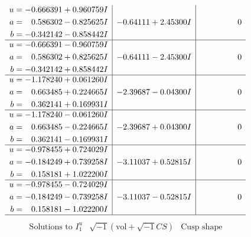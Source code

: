 \documentclass[1p]{elsarticle_modified}
\theoremstyle{definition}
\newcommand{\I}{\sqrt{-1}}
\begin{document}
$$\begin{array}{c|c|c}
\begin{aligned}
u &= -0.666391 + 0.960759 I \\
a &= \phantom{-}0.586302 - 0.825625 I \\
b &= -0.342142 - 0.858442 I\end{aligned}
 & -0.64111 + 2.45300 I & \phantom{-0.000000 } 0 \\ \hline\begin{aligned}
u &= -0.666391 - 0.960759 I \\
a &= \phantom{-}0.586302 + 0.825625 I \\
b &= -0.342142 + 0.858442 I\end{aligned}
 & -0.64111 - 2.45300 I & \phantom{-0.000000 } 0 \\ \hline\begin{aligned}
u &= -1.178240 + 0.061260 I \\
a &= \phantom{-}0.663485 + 0.224665 I \\
b &= \phantom{-}0.362141 + 0.169931 I\end{aligned}
 & -2.39687 - 0.04300 I & \phantom{-0.000000 } 0 \\ \hline\begin{aligned}
u &= -1.178240 - 0.061260 I \\
a &= \phantom{-}0.663485 - 0.224665 I \\
b &= \phantom{-}0.362141 - 0.169931 I\end{aligned}
 & -2.39687 + 0.04300 I & \phantom{-0.000000 } 0 \\ \hline\begin{aligned}
u &= -0.978455 + 0.724029 I \\
a &= -0.184249 + 0.739258 I \\
b &= \phantom{-}0.158181 + 1.022200 I\end{aligned}
 & -3.11037 + 0.52815 I & \phantom{-0.000000 } 0 \\ \hline\begin{aligned}
u &= -0.978455 - 0.724029 I \\
a &= -0.184249 - 0.739258 I \\
b &= \phantom{-}0.158181 - 1.022200 I\end{aligned}
 & -3.11037 - 0.52815 I & \phantom{-0.000000 } 0\\
 \hline 
 \end{array}$$\newpage$$\begin{array}{c|c|c}  
\text{Solutions to }I^u_{1}& \I (\text{vol} + \sqrt{-1}CS) & \text{Cusp shape}\\
 \hline 
\begin{aligned}

\end{aligned}
\end{array}$$
\end{document}

